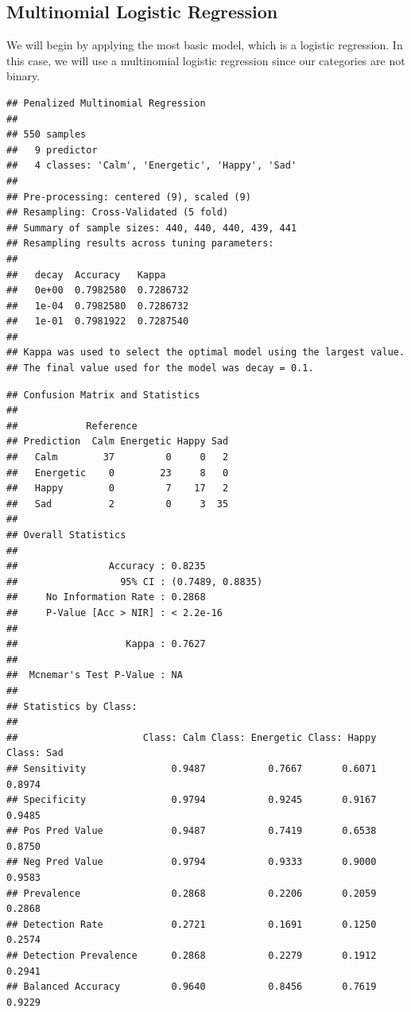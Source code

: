 \documentclass[11pt,]{article}
\begin{document}
\hypertarget{multinomial-logistic-regression}{%
\subsection{Multinomial Logistic
Regression}\label{multinomial-logistic-regression}}

We will begin by applying the most basic model, which is a logistic
regression. In this case, we will use a multinomial logistic regression
since our categories are not binary.

\begin{verbatim}
## Penalized Multinomial Regression 
## 
## 550 samples
##   9 predictor
##   4 classes: 'Calm', 'Energetic', 'Happy', 'Sad' 
## 
## Pre-processing: centered (9), scaled (9) 
## Resampling: Cross-Validated (5 fold) 
## Summary of sample sizes: 440, 440, 440, 439, 441 
## Resampling results across tuning parameters:
## 
##   decay  Accuracy   Kappa    
##   0e+00  0.7982580  0.7286732
##   1e-04  0.7982580  0.7286732
##   1e-01  0.7981922  0.7287540
## 
## Kappa was used to select the optimal model using the largest value.
## The final value used for the model was decay = 0.1.
\end{verbatim}

\begin{verbatim}
## Confusion Matrix and Statistics
## 
##            Reference
## Prediction  Calm Energetic Happy Sad
##   Calm        37         0     0   2
##   Energetic    0        23     8   0
##   Happy        0         7    17   2
##   Sad          2         0     3  35
## 
## Overall Statistics
##                                           
##                Accuracy : 0.8235          
##                  95% CI : (0.7489, 0.8835)
##     No Information Rate : 0.2868          
##     P-Value [Acc > NIR] : < 2.2e-16       
##                                           
##                   Kappa : 0.7627          
##                                           
##  Mcnemar's Test P-Value : NA              
## 
## Statistics by Class:
## 
##                      Class: Calm Class: Energetic Class: Happy Class: Sad
## Sensitivity               0.9487           0.7667       0.6071     0.8974
## Specificity               0.9794           0.9245       0.9167     0.9485
## Pos Pred Value            0.9487           0.7419       0.6538     0.8750
## Neg Pred Value            0.9794           0.9333       0.9000     0.9583
## Prevalence                0.2868           0.2206       0.2059     0.2868
## Detection Rate            0.2721           0.1691       0.1250     0.2574
## Detection Prevalence      0.2868           0.2279       0.1912     0.2941
## Balanced Accuracy         0.9640           0.8456       0.7619     0.9229
\end{verbatim}
\end{document}

